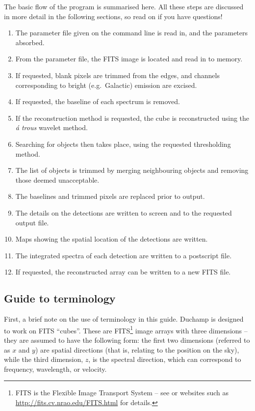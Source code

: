 \documentclass[12pt,a4paper]{article}
\newcommand{\eg}{e.g.\ }
\begin{document}
The basic flow of the program is summarised here. All these steps are
discussed in more detail in the following sections, so read on if
you have questions!
\begin{enumerate}
\item The parameter file given on the command line is read in, and the
  parameters absorbed.
\item From the parameter file, the FITS image is located and read in
  to memory.
\item If requested, blank pixels are trimmed from the edges, and
  channels corresponding to bright (\eg Galactic) emission are
  excised. 
\item If requested, the baseline of each spectrum is removed.
\item If the reconstruction method is requested, the cube is
  reconstructed using the {\it {\' a} trous} wavelet method.
\item Searching for objects then takes place, using the requested
  thresholding method.
\item The list of objects is trimmed by merging neighbouring objects
  and removing those deemed unacceptable.
\item The baselines and trimmed pixels are replaced prior to output.
\item The details on the detections are written to screen and to the
  requested output file.
\item Maps showing the spatial location of the detections are written.
\item The integrated spectra of each detection are written to a
  postscript file. 
\item If requested, the reconstructed array can be written to a new
  FITS file.
\end{enumerate}

\subsection{Guide to terminology}

First, a brief note on the use of terminology in this guide. Duchamp
is designed to work on FITS ``cubes''. These are FITS\footnote{FITS is
the Flexible Image Transport System -- see \citet{hanisch01} or
websites such as 
\href{http://fits.cv.nrao.edu/FITS.html}{http://fits.cv.nrao.edu/FITS.html}
for details.} image arrays with three dimensions -- they are assumed
to have the following form: the first two dimensions (referred to as
$x$ and $y$) are spatial directions (that is, relating to the position
on the sky), while the third dimension, $z$, is the spectral
direction, which can correspond to frequency, wavelength, or velocity.
\end{document}
